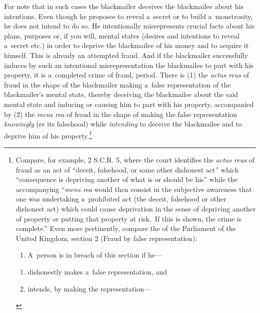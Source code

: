 For note that in such cases the blackmailer deceives the blackmailee about his intentions. Even though he proposes to reveal a~secret or to build a~monstrosity, he does not intend to do so. He intentionally misrepresents crucial facts about his plans, purposes or, if you will, mental states (desires and intentions to reveal a~secret etc.) in order to deprive the blackmailee of his money and to acquire it himself. This is already an attempted fraud. And if the blackmailer successfully induces by such an intentional misrepresentation the blackmailee to part with his property, it is a~completed crime of fraud, period. There is (1) the \textit{actus reus} of fraud in the shape of the blackmailer making a~false representation of the blackmailer's mental state, thereby deceiving the blackmailee about the said mental state and inducing or causing him to part with his property, accompanied by (2) the \textit{mens rea} of fraud in the shape of making the false representation \textit{knowingly} (re its falsehood) while \textit{intending} to deceive the blackmailee and to deprive him of his property.\footnote{Compare, for example, 
\parencite[][]{} %
 2 S.C.R. 5, where the court identifies the \textit{actus reus} of fraud as an act of ``deceit, falsehood, or some other dishonest act'' which ``consequence is depriving another of what is or should be his'' while the accompanying ``\textit{mens rea} would then consist in the subjective awareness that one was undertaking a~prohibited act (the deceit, falsehood or other dishonest act) which could cause deprivation in the sense of depriving another of property or putting that property at risk.~If this is shown, the crime is complete.'' Even more pertinently, compare the 
\parencite[][]{} %
 of the Parliament of the United Kingdom, section 2 (Fraud by false representation): \liststyleWWNumiii

\begin{enumerate}

\item A~person is in breach of this section if he---

\end{enumerate}

\begin{enumerate}

\item dishonestly makes a~false representation, and

\item intends, by making the representation---


\end{enumerate}}
